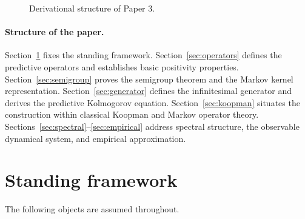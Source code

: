 \begin{figure}[h]
\centering
{}
\caption{Derivational structure of Paper 3.}
\label{fig:paper3-spine}
\end{figure}

\paragraph{Structure of the paper.}
Section~\ref{sec:framework} fixes the standing framework.
Section~\ref{sec:operators} defines the predictive operators and
establishes basic positivity properties.
Section~\ref{sec:semigroup} proves the semigroup theorem and the
Markov kernel representation.
Section~\ref{sec:generator} defines the infinitesimal generator and
derives the predictive Kolmogorov equation.
Section~\ref{sec:koopman} situates the construction within classical
Koopman and Markov operator theory.
Sections~\ref{sec:spectral}--\ref{sec:empirical} address spectral
structure, the observable dynamical system, and empirical approximation.

\section{Standing framework}\label{sec:framework}

The following objects are assumed throughout.

